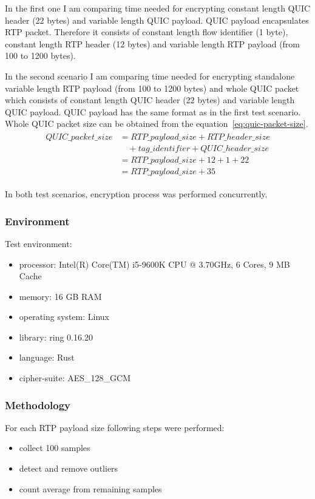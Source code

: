In the first one I am comparing time needed for encrypting constant length QUIC header (22 bytes) and variable length QUIC payload.
QUIC payload encapsulates RTP packet.
Therefore it consists of constant length flow identifier (1 byte), constant length RTP header (12 bytes) and variable length RTP payload (from 100 to 1200 bytes).

In the second scenario I am comparing time needed for encrypting standalone variable length RTP payload (from 100 to 1200 bytes)
and whole QUIC packet which consists of constant length QUIC header (22 bytes) and variable length QUIC payload.
QUIC payload has the same format as in the first test scenario.
Whole QUIC packet size can be obtained from the equation~\ref{eq:quic-packet-size}.
\begin{align}
    \begin{split}
        QUIC\_packet\_size & = RTP\_payload\_size + RTP\_header\_size \\
        & \quad + tag\_identifier + QUIC\_header\_size \\
        & = RTP\_payload\_size + 12 + 1 + 22 \\
        & = RTP\_payload\_size + 35
    \end{split}
    \label{eq:quic-packet-size}
\end{align}

In both test scenarios, encryption process was performed concurrently.

\subsubsection{Environment}
Test environment:
\begin{itemize}
    \item processor: Intel(R) Core(TM) i5-9600K CPU @ 3.70GHz, 6 Cores, 9 MB Cache
    \item memory: 16 GB RAM
    \item operating system: Linux
    \item library: ring 0.16.20
    \item language: Rust
    \item cipher-suite: AES\_128\_GCM
\end{itemize}

\subsubsection{Methodology}
For each RTP payload size following steps were performed:
\begin{itemize}
    \item collect 100 samples
    \item detect and remove outliers
    \item count average from remaining samples
\end{itemize}

